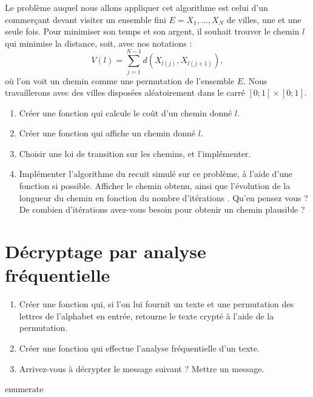 \documentclass[a4paper]{article}
\begin{document}
Le problème auquel nous allons appliquer cet algorithme est celui d'un commerçant devant visiter un ensemble fini $E={X_1,...,X_N}$ de villes, une et une seule fois. Pour minimiser son temps et son argent, il souhait trouver le chemin $l$ qui minimise la distance, soit, avec nos notations :
\[V(l)=\sum_{j=1}^{N-1} d(X_{l(j)},X_{l(j+1)}),\]
où l'on voit un chemin comme une permutation de l'ensemble $E$. Nous travaillerons avec des villes disposées aléatoirement dans le carré $[0;1]\times [0;1]$.
 
\begin{enumerate}
\item Créer une fonction qui calcule le coût d'un chemin donné $l$.
\item Créer une fonction qui affiche un chemin donné $l$.
\item Choisir une loi de transition sur les chemins, et l'implémenter.
\item Implémenter l'algorithme du recuit simulé sur ce problème, à l'aide d'une fonction si possible. Afficher le chemin obtenu, ainsi que l'évolution de la longueur du chemin en fonction du nombre d'itérations . Qu'en pensez vous ? De combien d'itérations avez-vous besoin pour obtenir un chemin plausible ? 
\end{enumerate}

\section{Décryptage par analyse fréquentielle}

\begin{enumerate}
\item Créer une fonction qui, si l'on lui fournit un texte et une permutation des lettres de l'alphabet en entrée, retourne le texte crypté à l'aide de la permutation.
\item Créer une fonction qui effectue l'analyse fréquentielle d'un texte.
\item Arrivez-vous à décrypter le message suivant ? Mettre un message. 
\end{enumerate}{enumerate}
\end{document}
